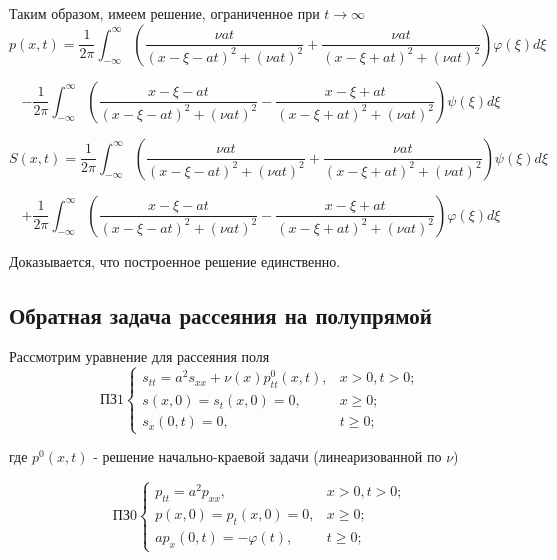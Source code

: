 \documentclass{article}
\begin{document}
Таким образом, имеем решение, ограниченное при $t \to \infty$
\begin{equation*}
    p(x,t) = \frac{1}{2\pi} \int_{-\infty}^{\infty} \left( \frac{\nu a t}{(x - \xi - a t)^2 + (\nu a t)^2} + \frac{\nu a t}{(x - \xi + a t)^2 + (\nu a t)^2} \right) \varphi(\xi) d\xi 
\end{equation*}

\begin{equation*}
	- \frac{1}{2\pi} \int_{-\infty}^{\infty} \left( \frac{x - \xi - a t}{(x - \xi - a t)^2 + (\nu a t)^2} - \frac{x - \xi + a t}{(x - \xi + a t)^2 + (\nu a t)^2} \right) \psi(\xi) d\xi
\end{equation*}

\begin{equation*}
    S(x,t) = \frac{1}{2\pi} \int_{-\infty}^{\infty} \left( \frac{\nu a t}{(x - \xi - a t)^2 + (\nu a t)^2} + \frac{\nu a t}{(x - \xi + a t)^2 + (\nu a t)^2} \right) \psi(\xi) d\xi 
\end{equation*}

\begin{equation*}
    + \frac{1}{2\pi} \int_{-\infty}^{\infty} \left( \frac{x - \xi - a t}{(x - \xi - a t)^2 + (\nu a t)^2} - \frac{x - \xi + a t}{(x - \xi + a t)^2 + (\nu a t)^2} \right) \varphi(\xi) d\xi
\end{equation*}

Доказывается, что построенное решение единственно.


\subsection*{Обратная задача рассеяния на полупрямой}

Рассмотрим уравнение для рассеяния поля
$$
\text{ПЗ1}
\begin{cases}
s_{tt} = a^2 s_{xx} + \nu(x) p_{tt}^0(x,t),& x > 0, t > 0;\\
s(x,0) = s_t(x,0) = 0, & x \geqslant 0;\\
s_x(0,t) = 0, & t \geqslant 0;
\end{cases}
$$

где $p^0(x,t)$ - решение начально-краевой задачи (линеаризованной по $\nu$)

$$
\text{ПЗ0}
\begin{cases}
	p_{tt} = a^2 p_{xx},& x > 0, t > 0;\\
	p(x,0) = p_t(x,0) = 0, & x \geqslant 0;\\
	ap_x(0,t) = -\varphi(t), & t \geqslant 0;
\end{cases}
$$
\end{document}
